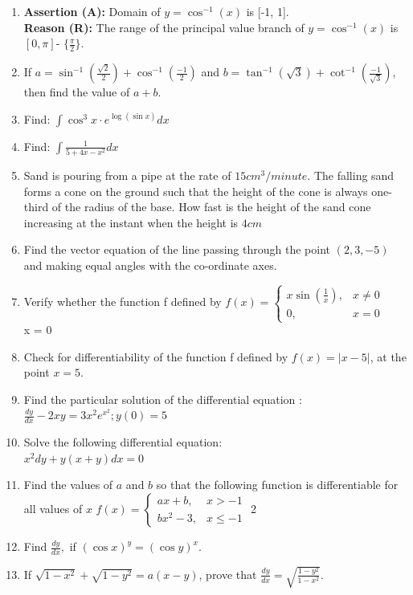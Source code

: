 \documentclass{article}
\providecommand{\brak}[1]{\ensuremath{\left(#1\right)}}
\begin{document}
\begin{enumerate}
	\item \textbf{Assertion (A):} Domain of $ y = \cos^{-1}(x) $ is [-1, 1].\\
		\textbf{Reason (R):} The range of the principal value branch of $ y = \cos^{-1}(x) $ is $[0, \pi]$- $\{\frac{\pi}{2}\}$.


\item If $ a = \sin^{-1}\left(\frac{\sqrt{2}}{2}\right) + \cos^{-1}\left(\frac{-1}{2}\right) $ and $ b = \tan^{-1}(\sqrt{3}) + \cot^{-1}\left(\frac{-1}{\sqrt{3}}\right) $, then find the value of $a + b$.


\item Find: $\int \cos^3  x \cdot e^{\log(\sin x)}dx$

\item Find: $\int \frac{1}{5+4x-x^2}dx$	

\item Sand is pouring from a pipe at the rate of $ 15 cm^3/minute$. The falling sand forms a cone on the ground such that the height of the cone is always one- third of the radius of the base. How fast is the height of the sand cone increasing at the instant when the height is $4cm$	 

\item Find the vector equation of the line passing through the point $(2, 3, -5)$ and making equal angles with the co-ordinate axes.

\item Verify whether the function f defined by $f\brak{x} = \begin{cases} x \sin{\left(\frac{1}{x}\right)}, & x \neq 0 \\ 0, & x = 0 \end{cases} $\\
 x = 0 


\item Check for differentiability  of the function f defined by $f(x) = |x-5|$, at the point $x = 5$.


\item Find the particular solution of the  differential equation : \\
	$ \frac{dy}{dx} - 2xy = 3x^2e^{x^2} ; y(0)=5 $

\item Solve the following differential equation:\\
	$x^2 dy+y(x+y)dx=0$

\item Find the values of $a$ and $b$ so that the following function is differentiable for all values of $x$  $f\brak{x} = \begin{cases} ax+b, & x>-1 \\ bx^2-3, & x\le -1 \end{cases} $
2
\item Find $ \frac{dy}{dx},$ if $(\cos{x})^y = (\cos{y})^x.$
\item If $\sqrt{1-x^2} + \sqrt{1-y^2} =a(x-y)$, prove that $ \frac{dy}{dx}= \sqrt{\frac{1-y^2}{1-x^2}}.$




\end{enumerate}
\end{document}
